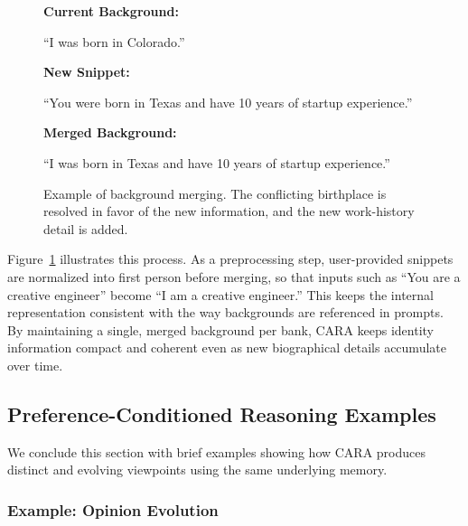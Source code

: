 \begin{figure}[t]
\centering
\begin{tcolorbox}[
    colback=teal!5!white,
    colframe=teal!60!black,
    title=Background Merging Example,
    fonttitle=\bfseries,
    coltitle=white,
    colbacktitle=teal!60!black,
    boxrule=0.8pt,
    arc=1mm,
    enhanced,
    width=0.95\linewidth
]
\textbf{Current Background:}

``I was born in Colorado.''

\vspace{0.2cm}

\textbf{New Snippet:}

``You were born in Texas and have 10 years of startup experience.''

\vspace{0.2cm}

\textbf{Merged Background:}

``I was born in Texas and have 10 years of startup experience.''
\end{tcolorbox}

\caption{Example of background merging. The conflicting birthplace is resolved in favor of the new information, and the new work-history detail is added.}
\label{fig:background-merging}
\end{figure}

Figure~\ref{fig:background-merging} illustrates this process. As a preprocessing step, user-provided snippets are normalized into first person before merging, so that inputs such as ``You are a creative engineer'' become ``I am a creative engineer.'' This keeps the internal representation consistent with the way backgrounds are referenced in prompts. By maintaining a single, merged background per bank, CARA keeps identity information compact and coherent even as new biographical details accumulate over time.

\subsection{Preference-Conditioned Reasoning Examples}

We conclude this section with brief examples showing how CARA produces distinct and evolving viewpoints using the same underlying memory.

\subsubsection{Example: Opinion Evolution}

